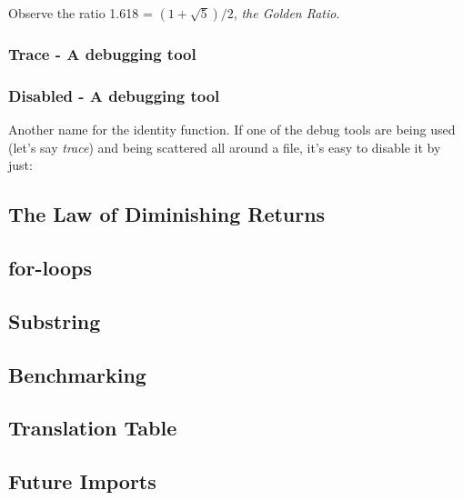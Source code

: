 \documentclass[12pt]{article}
\begin{document}


Observe the ratio 1.618 = $(1+\sqrt{5})/2$, \emph{the Golden Ratio}.




\subsubsection{Trace - A debugging tool}





\subsubsection{Disabled - A debugging tool}

Another name for the identity function. If one of the debug tools are being used (let's say \emph{trace}) and being scattered all around a file, it's easy to disable it by just:







\subsection{The Law of Diminishing Returns}

\subsection{for-loops}




\subsection{Substring}


\subsection{Benchmarking}


\subsection{Translation Table}


\subsection{Future Imports}
\end{document}
